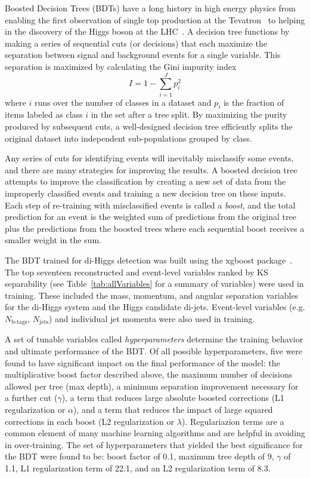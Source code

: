 \label{sec:BDT}
Boosted Decision Trees (BDTs) have a long history in high energy physics from enabling the first observation of single top production at the Tevatron~\cite{Abazov:2006gd, Aaltonen:2008sy} to helping in the discovery of the Higgs boson at the LHC~\cite{Aad_2012, Chatrchyan_2012}. A decision tree functions by making a series of sequential cuts (or decisions) that each maximize the separation between signal and background events for a single variable. This separation is maximized by calculating the Gini impurity index
\begin{equation*}
I = 1 - \sum_{i=1}^{J} p_i^2
\end{equation*}
where $i$ runs over the number of classes in a dataset and $p_i$ is the fraction of items labeled as class $i$ in the set after a tree split. By maximizing the purity produced by subsequent cuts, a well-designed decision tree efficiently splits the original dataset into independent sub-populations grouped by class.

Any series of cuts for identifying events will inevitably misclassify some events, and there are many strategies for improving the results. A boosted decision tree attempts to improve the classification by creating a new set of data from the improperly classified events and training a new decision tree on these inputs. Each step of re-training with misclassified events is called a \textit{boost}, and the total prediction for an event is the weighted sum of predictions from the original tree plus the predictions from the boosted trees where each sequential boost receives a smaller weight in the sum.

The BDT trained for di-Higgs detection was built using the xgboost package~\cite{xgboost}. The top seventeen reconstructed and event-level variables ranked by KS separability (see Table~\ref{tab:allVariables} for a summary of variables) were used in training. These included the mass, momentum, and angular separation variables for the di-Higgs system and the Higgs candidate di-jets. Event-level variables (e.g. $N_{\textrm{b-tags}}$, $N_{\textrm{jets}}$) and individual jet momenta were also used in training.

A set of tunable variables called \textit{hyperparameters} determine the training behavior and ultimate performance of the BDT. Of all possible hyperparameters, five were found to have significant impact on the final performance of the model: the multiplicative boost factor described above, the maximum number of decisions allowed per tree (max depth), a minimum separation improvement necessary for a further cut ($\gamma$), a term that reduces large absolute boosted corrections (L1 regularization or $\alpha$), and a term that reduces the impact of large squared corrections in each boost (L2 regularization or $\lambda$). Regulariazion terms are a common element of many machine learning algorithms and are helpful in avoiding in over-training. The set of hyperparameters that yielded the best significance for the BDT were found to be: boost factor of 0.1, maximum tree depth of 9, $\gamma$ of 1.1, L1 regularization term of 22.1, and an L2 regularization term of 8.3.

